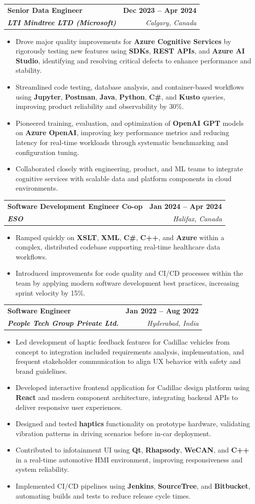\documentclass[letterpaper,11pt]{article}
\makeatletter
\newcommand{\resumeItem}[1]{
  \item\small{
    {#1 \vspace{-2pt}}
  }
}
\newcommand{\resumeSubheading}[4]{
  \vspace{-2pt}\item
    \begin{tabular*}{1.0\textwidth}[t]{l@{\extracolsep{\fill}}r}
      \textbf{#1} & \textbf{\small #2} \\
      \textit{\small#3} & \textit{\small #4} \\
    \end{tabular*}\vspace{-7pt}
}
\newcommand{\resumeItemListStart}{\begin{itemize}}
\newcommand{\resumeItemListEnd}{\end{itemize}\vspace{-5pt}}
\makeatother
\begin{document}
    \resumeSubheading
      {\textbf{Senior Data Engineer}}{\textbf{Dec 2023 -- Apr 2024}}
      {\textbf{LTI Mindtree LTD (Microsoft)}}{Calgary, Canada}
      \resumeItemListStart
        \resumeItem{Drove major quality improvements for \textbf{Azure Cognitive Services} by rigorously testing new features using \textbf{SDKs}, \textbf{REST APIs}, and \textbf{Azure AI Studio}, identifying and resolving critical defects to enhance performance and stability.}
        \resumeItem{Streamlined code testing, database analysis, and container-based workflows using \textbf{Jupyter}, \textbf{Postman}, \textbf{Java}, \textbf{Python}, \textbf{C\#}, and \textbf{Kusto} queries, improving product reliability and observability by 30\%.}
        \resumeItem{Pioneered training, evaluation, and optimization of \textbf{OpenAI GPT} models on \textbf{Azure OpenAI}, improving key performance metrics and reducing latency for real-time workloads through systematic benchmarking and configuration tuning.}
        \resumeItem{Collaborated closely with engineering, product, and ML teams to integrate cognitive services with scalable data and platform components in cloud environments.}
      \resumeItemListEnd
    
    \resumeSubheading
      {\textbf{Software Development Engineer Co-op}}{\textbf{Jan 2024 -- Apr 2024}}
      {\textbf{ESO}}{Halifax, Canada}
      \resumeItemListStart
        \resumeItem{Ramped quickly on \textbf{XSLT}, \textbf{XML}, \textbf{C\#}, \textbf{C++}, and \textbf{Azure} within a complex, distributed codebase supporting real-time healthcare data workflows.}
        \resumeItem{Introduced improvements for code quality and CI/CD processes within the team by applying modern software development best practices, increasing sprint velocity by 15\%.}
      \resumeItemListEnd

    \resumeSubheading
      {\textbf{Software Engineer}}{\textbf{Jan 2022 -- Aug 2022}}
      {\textbf{People Tech Group Private Ltd.}}{Hyderabad, India}
      \resumeItemListStart
        \resumeItem{Led development of haptic feedback features for Cadillac vehicles from concept to integration included requirements analysis, implementation, and frequent stakeholder communication to align UX behavior with safety and brand guidelines.}
        \resumeItem{Developed interactive frontend application for Cadillac design platform using \textbf{React} and modern component architecture, integrating backend APIs to deliver responsive user experiences.}
        \resumeItem{Designed and tested \textbf{haptics} functionality on prototype hardware, validating vibration patterns in driving scenarios before in-car deployment.}
        \resumeItem{Contributed to infotainment UI using \textbf{Qt}, \textbf{Rhapsody}, \textbf{WeCAN}, and \textbf{C++} in a real-time automotive HMI environment, improving responsiveness and system reliability.}
        \resumeItem{Implemented CI/CD pipelines using \textbf{Jenkins}, \textbf{SourceTree}, and \textbf{Bitbucket}, automating builds and tests to reduce release cycle times.}
      \resumeItemListEnd
\end{document}
